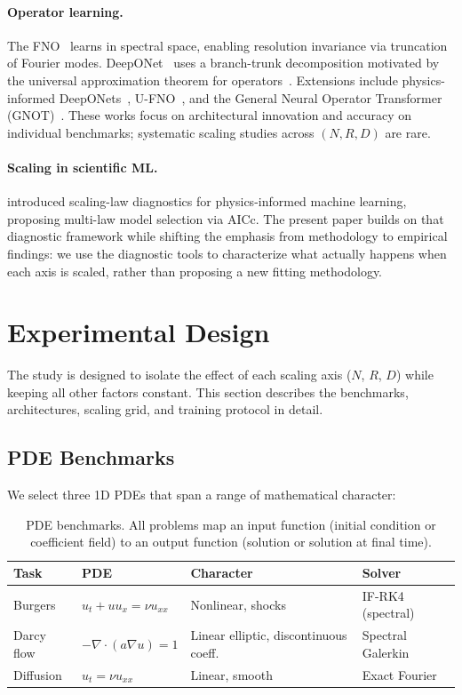 \documentclass[11pt]{article}
\begin{document}
\paragraph{Operator learning.}
The FNO~\citep{li2021fourier} learns in spectral space, enabling
resolution invariance via truncation of Fourier modes.
DeepONet~\citep{lu2021learning} uses a branch-trunk decomposition
motivated by the universal approximation theorem for
operators~\citep{chen1995universal}.
Extensions include physics-informed
DeepONets~\citep{wang2021learning}, U-FNO~\citep{wen2022ufno}, and
the General Neural Operator Transformer
(GNOT)~\citep{hao2023gnot}.
These works focus on architectural innovation and accuracy on
individual benchmarks; systematic scaling studies across
$(N, R, D)$ are rare.

\paragraph{Scaling in scientific ML.}
\citet{perrier2025scaling} introduced scaling-law diagnostics for
physics-informed machine learning, proposing multi-law model selection
via AICc. The present paper builds on that diagnostic framework while
shifting the emphasis from methodology to empirical findings: we use
the diagnostic tools to characterize what actually happens when each
axis is scaled, rather than proposing a new fitting methodology.


\section{Experimental Design}
\label{sec:design}

The study is designed to isolate the effect of each scaling axis
($N$, $R$, $D$) while keeping all other factors constant.
This section describes the benchmarks, architectures, scaling grid,
and training protocol in detail.

\subsection{PDE Benchmarks}
\label{sec:pdes}

We select three 1D PDEs that span a range of mathematical character:

\begin{table}[h]
\centering
\caption{PDE benchmarks. All problems map an input function
(initial condition or coefficient field) to an output function
(solution or solution at final time).}
\label{tab:tasks}
\begin{tabular}{@{}llll@{}}
\toprule
\textbf{Task} & \textbf{PDE} & \textbf{Character} &
\textbf{Solver} \\
\midrule
Burgers & $u_t + uu_x = \nu u_{xx}$ & Nonlinear, shocks &
IF-RK4 (spectral) \\
Darcy flow & $-\nabla \cdot (a \nabla u) = 1$ & Linear elliptic,
discontinuous coeff. & Spectral Galerkin \\
Diffusion & $u_t = \nu u_{xx}$ & Linear, smooth &
Exact Fourier \\
\bottomrule
\end{tabular}
\end{table}
\end{document}

